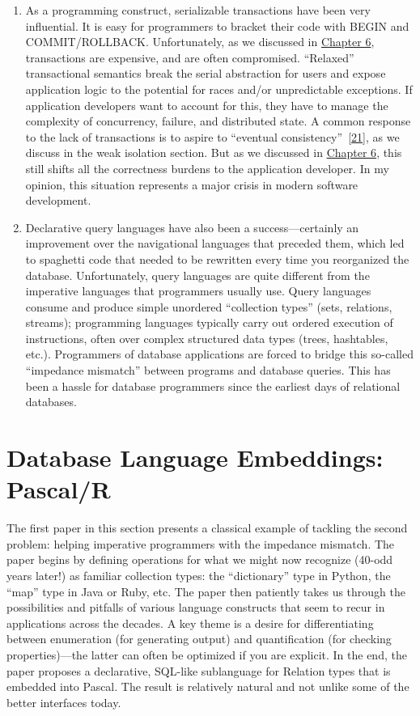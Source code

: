 \documentclass[b5paper,11pt,twoside,openright]{book}
\newcommand\Section[2]{
  \hypertarget{#1}{
    \section{#2}\label{#1}
  }
}
\begin{document}
\begin{enumerate}
  \item
  As a programming construct, serializable transactions have been very
  influential. It is easy for programmers to bracket their code with
  BEGIN and COMMIT/ROLLBACK. Unfortunately, as we discussed in
  \hyperref[ch6-isolation]{Chapter 6}, transactions are expensive, and
  are often compromised. ``Relaxed'' transactional semantics break the
  serial abstraction for users and expose application logic to the
  potential for races and/or unpredictable exceptions. If application
  developers want to account for this, they have to manage the
  complexity of concurrency, failure, and distributed state. A common
  response to the lack of transactions is to aspire to ``eventual
  consistency''~{{[}\protect\hyperlink{ref-bayou-session}{21}{]}}, as we
  discuss in the weak isolation section. But as we discussed in
  \hyperref[ch6-isolation]{Chapter 6}, this still shifts all the
  correctness burdens to the application developer. In my opinion, this
  situation represents a major crisis in modern software development.
  \item
  Declarative query languages have also been a success---certainly an
  improvement over the navigational languages that preceded them, which
  led to spaghetti code that needed to be rewritten every time you
  reorganized the database. Unfortunately, query languages are quite
  different from the imperative languages that programmers usually use.
  Query languages consume and produce simple unordered ``collection
  types'' (sets, relations, streams); programming languages typically
  carry out ordered execution of instructions, often over complex
  structured data types (trees, hashtables, etc.). Programmers of
  database applications are forced to bridge this so-called ``impedance
  mismatch'' between programs and database queries. This has been a
  hassle for database programmers since the earliest days of relational
  databases.
\end{enumerate}

\Section{database-language-embeddings-pascalr}{%
Database Language Embeddings: Pascal/R
}

The first paper in this section presents a classical example of tackling
the second problem: helping imperative programmers with the impedance
mismatch. The paper begins by defining operations for what we might now
recognize (40-odd years later!) as familiar collection types: the
``dictionary'' type in Python, the ``map'' type in Java or Ruby, etc.
The paper then patiently takes us through the possibilities and pitfalls
of various language constructs that seem to recur in applications across
the decades. A key theme is a desire for differentiating between
enumeration (for generating output) and quantification (for checking
properties)---the latter can often be optimized if you are explicit. In
the end, the paper proposes a declarative, SQL-like sublanguage for
Relation types that is embedded into Pascal. The result is relatively
natural and not unlike some of the better interfaces today.
\end{document}
